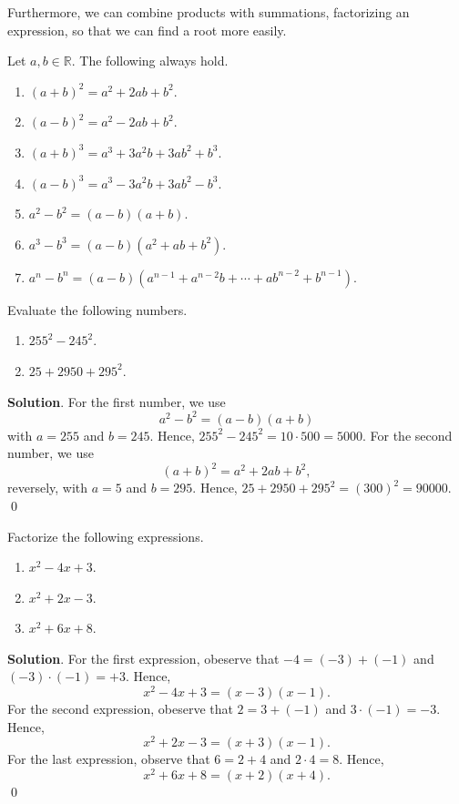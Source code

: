 \documentclass[11pt]{book}
\theoremstyle{break}
\theoremstyle{no_label}
\newcommand{\bbR}{\mathbb{R}}
\numberwithin{equation}{section}
\begin{document}
Furthermore, we can combine products with summations, factorizing an expression, so that we can find a root more easily.

\begin{theorem}[Factorization]
    Let $a, b\in\bbR$. The following always hold.
    \begin{enumerate}
        \item $(a+b)^2=a^2+2ab+b^2$.
        \item $(a-b)^2=a^2-2ab+b^2$.
        \item $(a+b)^3=a^3+3a^2b+3ab^2+b^3$.
        \item $(a-b)^3=a^3-3a^2b+3ab^2-b^3$.
        \item $a^2-b^2=(a-b)(a+b)$.
        \item $a^3-b^3=(a-b)(a^2+ab+b^2)$.
        \item $a^n-b^n=(a-b)(a^{n-1}+a^{n-2}b+\cdots+ab^{n-2}+b^{n-1})$.
    \end{enumerate}
\end{theorem}

\begin{example}
    Evaluate the following numbers.
    \begin{enumerate}
        \item $255^2-245^2$.
        \item $25+2950+295^2$.
    \end{enumerate}
\end{example}
\textbf{Solution}. For the first number, we use $$a^2-b^2=(a-b)(a+b)$$ with $a=255$ and $b=245$. Hence, $255^2-245^2=10\cdot500=5000$. For the second number, we use $$(a+b)^2=a^2+2ab+b^2,$$ reversely, with $a=5$ and $b=295$. Hence, $25+2950+295^2=(300)^2=90000$. \qed

\begin{example}
    Factorize the following expressions.
    \begin{enumerate}
        \item $x^2-4x+3$.
        \item $x^2+2x-3$.
        \item $x^2+6x+8$.
    \end{enumerate}
\end{example}
\textbf{Solution}. For the first expression, obeserve that $-4=(-3)+(-1)$ and $(-3)\cdot(-1)=+3$. Hence, $$x^2-4x+3=(x-3)(x-1).$$ For the second expression, obeserve that $2=3+(-1)$ and $3\cdot(-1)=-3$. Hence, $$x^2+2x-3=(x+3)(x-1).$$ For the last expression, observe that $6=2+4$ and $2\cdot4=8$. Hence, $$x^2+6x+8=(x+2)(x+4).$$ \qed
\end{document}
